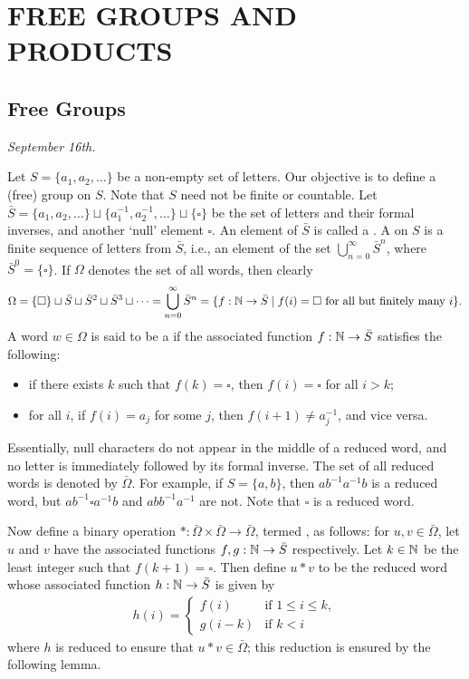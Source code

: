 \chapter{FREE GROUPS AND PRODUCTS}


\section{Free Groups}

\textit{September 16th.}

Let $S = \{a_{1},a_{2},\ldots\}$ be a non-empty set of letters. Our objective is to define a (free) group on $S$. Note that $S$ need not be finite or countable. Let $\bar{S} = \{a_{1},a_{2},\ldots\} \sqcup \{a_{1}^{-1},a_{2}^{-1},\ldots\} \sqcup \{\square\}$ be the set of letters and their formal inverses, and another `null' element $\square$. An element of $\bar{S}$ is called a . A  on $S$ is a finite sequence of letters from $\bar{S}$, i.e., an element of the set $\bigcup_{n=0}^{\infty} \bar{S}^{n}$, where $\bar{S}^{0} = \{\square\}$. If $\Omega$ denotes the set of all words,
then clearly
\begin{align}
    \Omega = \{\square\} \sqcup \bar{S} \sqcup \bar{S}^{2} \sqcup \bar{S}^{3} \sqcup \cdots = \bigcup_{n=0}^{\infty} \bar{S}^{n} = \{f:\mathbb{N} \to \bar{S} \mid f(i) = \square \text{ for all but finitely many } i\}.
\end{align}
A word $w \in \Omega$ is said to be a  if the associated function $f:\mathbb{N} \to \bar{S}$ satisfies the following:
\begin{itemize}
    \item if there exists $k$ such that $f(k) = \square$, then $f(i) = \square$ for all $i > k$;
    \item for all $i$, if $f(i) = a_{j}$ for some $j$, then $f(i+1) \neq a_{j}^{-1}$, and vice versa.
\end{itemize}
Essentially, null characters do not appear in the middle of a reduced word, and no letter is immediately followed by its formal inverse. The set of all reduced words is denoted by $\bar{\Omega}$. For example, if $S = \{a,b\}$, then $ab^{-1}a^{-1}b$ is a reduced word, but $ab^{-1}\square a^{-1}b$ and $abb^{-1}a^{-1}$ are not. Note that $\square$ is a reduced word.

Now define a binary operation $\ast:\bar{\Omega}\times\bar{\Omega} \to \bar{\Omega}$, termed , as follows: for $u,v \in \bar{\Omega}$, let $u$ and $v$ have the associated functions $f,g:\mathbb{N} \to \bar{S}$ respectively. Let $k \in \mathbb{N}$ be the least integer such that $f(k+1) = \square$. Then define $u \ast v$ to be the reduced word whose associated function $h:\mathbb{N} \to \bar{S}$ is given by
\begin{align}
    h(i) = \begin{cases}
        f(i) & \text{if } 1 \leq i \leq k,\\
        g(i-k) & \text{if } k < i
    \end{cases}
\end{align}
where $h$ is reduced to ensure that $u \ast v \in \bar{\Omega}$; this reduction is ensured by the following lemma.

